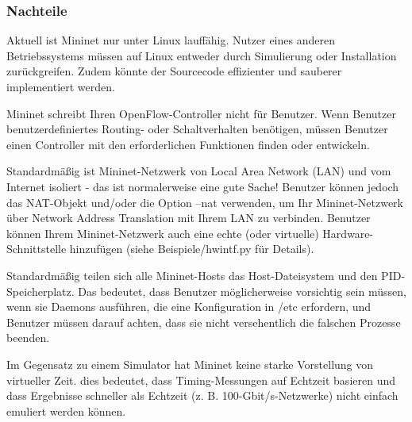 \documentclass[fontsize=12pt,paper=a4,open=any,parskip=half,
  twoside=false,toc=listof,toc=bibliography,fleqn,leqno,
  captions=nooneline,captions=tableabove,british]{scrbook}
\begin{document}
\subsubsection{Nachteile}
Aktuell ist Mininet nur unter Linux lauffähig. Nutzer eines anderen Betriebssystems müssen auf Linux entweder durch Simulierung oder Installation zurückgreifen. Zudem könnte der Sourcecode effizienter und sauberer implementiert werden.\par
Mininet schreibt Ihren OpenFlow-Controller nicht für Benutzer. Wenn Benutzer benutzerdefiniertes Routing- oder Schaltverhalten benötigen, müssen Benutzer einen Controller mit den erforderlichen Funktionen finden oder entwickeln.\par
Standardmäßig ist Mininet-Netzwerk von Local Area Network (LAN) und vom Internet isoliert - das ist normalerweise eine gute Sache! Benutzer können jedoch das NAT-Objekt und/oder die Option --nat verwenden, um Ihr Mininet-Netzwerk über Network Address Translation mit Ihrem LAN zu verbinden. Benutzer können Ihrem Mininet-Netzwerk auch eine echte (oder virtuelle) Hardware-Schnittstelle hinzufügen (siehe Beispiele/hwintf.py für Details).\par
Standardmäßig teilen sich alle Mininet-Hosts das Host-Dateisystem und den PID-Speicherplatz. Das bedeutet, dass Benutzer möglicherweise vorsichtig sein müssen, wenn sie Daemons ausführen, die eine Konfiguration in /etc erfordern, und Benutzer müssen darauf achten, dass sie nicht versehentlich die falschen Prozesse beenden. \par
Im Gegensatz zu einem Simulator hat Mininet keine starke Vorstellung von virtueller Zeit. dies bedeutet, dass Timing-Messungen auf Echtzeit basieren und dass Ergebnisse schneller als Echtzeit (z. B. 100-Gbit/s-Netzwerke) nicht einfach emuliert werden können.
\end{document}

